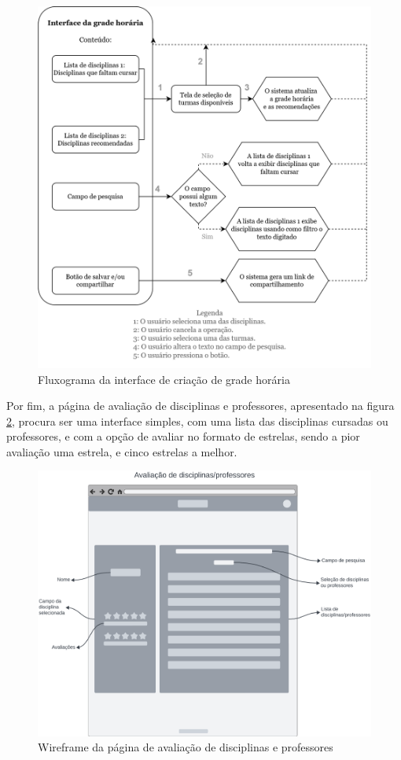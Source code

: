 \begin{figure}[ht]
    \begin{center}
    \includegraphics[width=390pt]{figuras/fluxograma-grade.png}
    \caption{Fluxograma da interface de criação de grade horária}
    \label{fig:fluxograma-grade}
    \end{center}
\end{figure}

Por fim, a página de avaliação de disciplinas e professores, apresentado na figura \ref{fig:wireframe-pagina-avaliacao}, procura ser uma interface simples, com uma lista das disciplinas cursadas ou professores, e com a opção de avaliar no formato de estrelas, sendo a pior avaliação uma estrela, e cinco estrelas a melhor.

\begin{figure}[ht]
    \begin{center}
    \includegraphics[width=390pt]{figuras/pagina-avaliacao.png}
    \caption{Wireframe da página de avaliação de disciplinas e professores}
    \label{fig:wireframe-pagina-avaliacao}
    \end{center}
\end{figure}